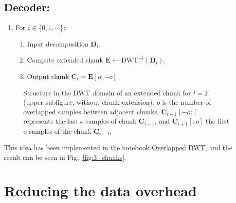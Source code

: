 \subsection*{Decoder:}
\begin{enumerate}
\item For $i\in\{0,1,\cdots\}$:
  \begin{enumerate}
  \item Input decomposition ${\mathbf D}_i$.
  \item Compute extended chunk ${\mathbf E}\leftarrow\text{DWT}^{-l}({\mathbf D}_i)$.
  \item Output chunk ${\mathbf C}_i={\mathbf E}[o:-o]$.
  \end{enumerate}
\end{enumerate}


\begin{figure}
  \centering
  \caption{Structure in the DWT domain of an extended chunk for $l=2$
    (upper subfigure, without chunk extension). $o$ is the number of
    overlapped samples between adjacent chunks.
    ${\mathbf C}_{i-1}[-o:]$ represents the last $o$ samples of chunk
    ${\mathbf C}_{i-1}$, and ${\mathbf C}_{i+1}[:o]$ the first $o$
    samples of the chunk ${\mathbf C}_{i+1}$.}
  \label{fig:subbands}
\end{figure}

This idea has been implemented in the notebook
\href{https://github.com/Tecnologias-multimedia/Tecnologias-multimedia.github.io/blob/master/contents/transform_coding/overlapped_DWT_I.ipynb}{Overlapped
  DWT}, and the result can be seen in Fig.~\ref{fig:3_chunks}.


\section{Reducing the data overhead}

\label{sec:reducing}


